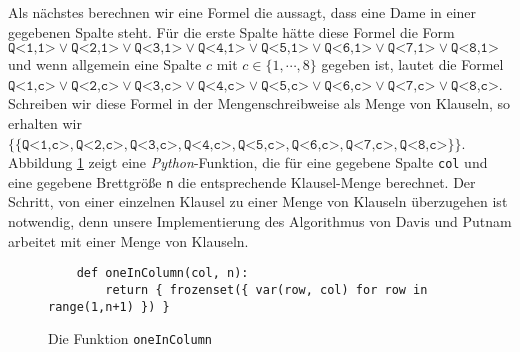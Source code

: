 Als nächstes berechnen wir eine Formel die aussagt, dass  eine Dame in einer gegebenen
Spalte steht.  Für die erste Spalte hätte diese Formel die Form 
\\[0.2cm]
\hspace*{1.3cm}
$\texttt{Q<1,1>} \vee \texttt{Q<2,1>} \vee \texttt{Q<3,1>} \vee \texttt{Q<4,1>} \vee \texttt{Q<5,1>} \vee
\texttt{Q<6,1>} \vee \texttt{Q<7,1>} \vee \texttt{Q<8,1>}$
\\[0.2cm]
und wenn allgemein eine Spalte $c$ mit $c \in \{1,\cdots,8\}$ gegeben ist, lautet die Formel
\\[0.2cm]
\hspace*{1.3cm}
$\texttt{Q<1,c>} \vee \texttt{Q<2,c>} \vee \texttt{Q<3,c>} \vee \texttt{Q<4,c>} \vee \texttt{Q<5,c>} \vee
\texttt{Q<6,c>} \vee \texttt{Q<7,c>} \vee \texttt{Q<8,c>}$.
\\[0.2cm]
Schreiben wir diese Formel in der Mengenschreibweise als Menge von Klauseln, so erhalten wir
\\[0.2cm]
\hspace*{1.3cm}
$\bigl\{ \{\texttt{Q<1,c>} , \texttt{Q<2,c>} , \texttt{Q<3,c>} , \texttt{Q<4,c>} , \texttt{Q<5,c>} ,
\texttt{Q<6,c>} , \texttt{Q<7,c>} , \texttt{Q<8,c>} \}\bigr\}$.
\\[0.2cm]
Abbildung \ref{fig:oneInColumn} zeigt eine \textsl{Python}-Funktion, die für eine gegebene Spalte
\texttt{col} und eine gegebene Brettgröße \texttt{n} die entsprechende Klausel-Menge berechnet.
Der Schritt, von einer einzelnen Klausel 
zu einer Menge von Klauseln überzugehen ist notwendig, denn unsere Implementierung des Algorithmus von
Davis und Putnam arbeitet mit einer Menge von Klauseln.

\begin{figure}[!ht]
  \centering
\begin{verbatim}
    def oneInColumn(col, n):
        return { frozenset({ var(row, col) for row in range(1,n+1) }) }
\end{verbatim}
\vspace*{-0.3cm}
  \caption{Die Funktion \texttt{oneInColumn}}
  \label{fig:oneInColumn}
\end{figure}

